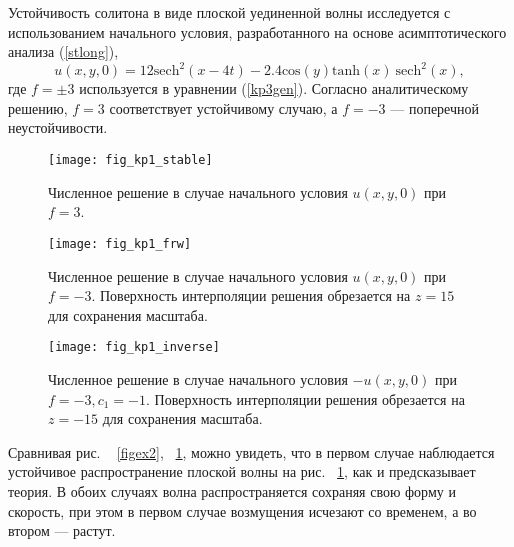 Устойчивость солитона в виде плоской уединенной волны исследуется с использованием начального условия, разработанного на основе асимптотического анализа (\ref {stlong}),
\begin{equation}
	\label{kp1ex2}
	u(x,y,0)=12{\text{sech}}^2(x-4t) - 2.4 {\text{cos}} (y) {\text{tanh}} (x) ~{\text{sech}}^2(x),
\end{equation}
где $ f = \pm 3 $ используется в уравнении (\ref {kp3gen}). Согласно аналитическому решению, $ f = 3 $ соответствует устойчивому случаю, а $ f = -3 $ --- поперечной неустойчивости.
\begin{figure}
	\centering
	\texttt{[image: fig\_kp1\_stable]}
	\caption{Численное решение в случае начального условия $u(x,y,0)$ при $f=3$.}\label{figex3}	
\end{figure}
\begin{figure}
	\centering
	\texttt{[image: fig\_kp1\_frw]}
	\caption{Численное решение в случае начального условия $u(x,y,0)$ при $f=-3$. Поверхность интерполяции решения обрезается на $ z = 15 $ для сохранения масштаба.}\label{figex4}	
\end{figure}
\begin{figure}
	\centering
	\texttt{[image: fig\_kp1\_inverse]}
	\caption{Численное решение в случае начального условия $-u(x,y,0)$ при $f=-3, c_1=-1$. Поверхность интерполяции решения обрезается на $ z = -15 $ для сохранения масштаба.}\label{figex44}	
\end{figure}

Сравнивая рис. ~ \ref{figex2}, ~\ref{figex3}, можно увидеть, что в первом случае наблюдается устойчивое распространение плоской волны на рис. ~\ref{figex3}, как и предсказывает теория. В обоих случаях волна распространяется сохраняя свою форму и скорость, при этом в первом случае возмущения исчезают со временем, а во втором --- растут.

